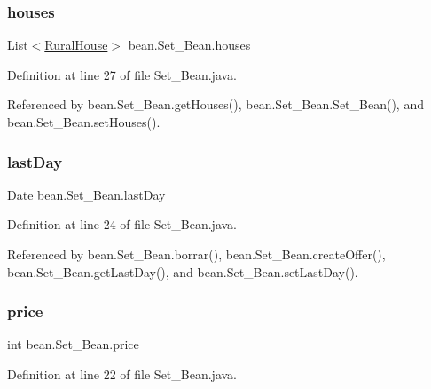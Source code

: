 \subsubsection{\texorpdfstring{houses}{houses}}
{\footnotesize\ttfamily List$<$\mbox{\hyperlink{classdomain_1_1RuralHouse}{Rural\+House}}$>$ bean.\+Set\+\_\+\+Bean.\+houses\hspace{0.3cm}{\ttfamily [private]}}



Definition at line 27 of file Set\+\_\+\+Bean.\+java.



Referenced by bean.\+Set\+\_\+\+Bean.\+get\+Houses(), bean.\+Set\+\_\+\+Bean.\+Set\+\_\+\+Bean(), and bean.\+Set\+\_\+\+Bean.\+set\+Houses().

\mbox{\label{classbean_1_1Set__Bean_ab7eaecf178a4ca10c791779a0bf72954}} 
\subsubsection{\texorpdfstring{lastDay}{lastDay}}
{\footnotesize\ttfamily Date bean.\+Set\+\_\+\+Bean.\+last\+Day\hspace{0.3cm}{\ttfamily [private]}}



Definition at line 24 of file Set\+\_\+\+Bean.\+java.



Referenced by bean.\+Set\+\_\+\+Bean.\+borrar(), bean.\+Set\+\_\+\+Bean.\+create\+Offer(), bean.\+Set\+\_\+\+Bean.\+get\+Last\+Day(), and bean.\+Set\+\_\+\+Bean.\+set\+Last\+Day().

\mbox{\label{classbean_1_1Set__Bean_a667afccf27f2b9861fecfb2f23bf9041}} 
\subsubsection{\texorpdfstring{price}{price}}
{\footnotesize\ttfamily int bean.\+Set\+\_\+\+Bean.\+price\hspace{0.3cm}{\ttfamily [private]}}



Definition at line 22 of file Set\+\_\+\+Bean.\+java.



